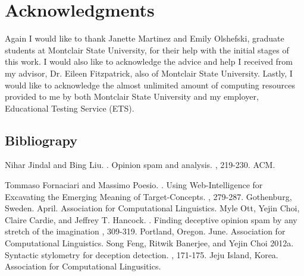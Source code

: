 \documentclass[9pt]{article}
\begin{document}
\section*{Acknowledgments}

Again I would like to thank Janette Martinez and Emily Olshefski, graduate students at Montclair State University, for their help with the initial stages of this work. I would also like to acknowledge the advice and help I received from my advisor, Dr. Eileen Fitzpatrick, also of Montclair State University. Lastly, I would like to acknowledge the almost unlimited amount of computing resources provided to me by both Montclair State University and my employer, Educational Testing Service (ETS).

\begin{thebibliography}{}

\section*{Bibliograpy}
Nihar Jindal and Bing Liu.
.
\newblock Opinion spam and analysis. 
, 219-230. ACM.

Tommaso Fornaciari and Massimo Poesio.
.
\newblock Using Web-Intelligence for Excavating the
	Emerging Meaning of Target-Concepts.
, 279-287. Gothenburg, Sweden. April. Association for Computational Linguistics.
Myle Ott, Yejin Choi, Claire Cardie, and Jeffrey T. Hancock.
.
\newblock  Finding deceptive opinion spam by any stretch of the imagination
, 309-319. Portland, Oregon. June. Association for Computational Linguistics.
Song Feng, Ritwik Banerjee, and Yejin Choi
\newblock 2012a.
\newblock Syntactic stylometry for deception detection.
, 171-175. Jeju Island, Korea. Association for Computational Lingusitics.

\end{thebibliography}
\end{document}

